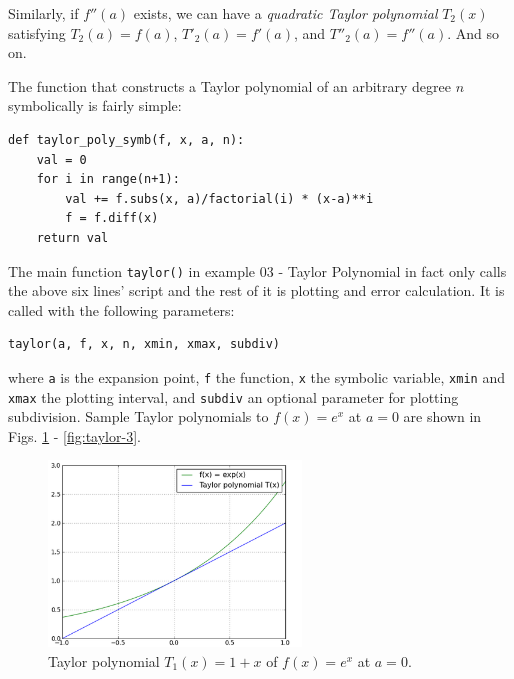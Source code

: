 \documentclass{article}
\begin{document}
Similarly, 
if $f''(a)$ exists, we can have a {\em quadratic Taylor polynomial} $T_2(x)$ satisfying
$T_2(a) = f(a)$, $T'_2(a) = f'(a)$, and $T''_2(a) = f''(a)$. And so on. 

The function that constructs a Taylor polynomial of an arbitrary degree $n$
symbolically is fairly simple:

\begin{verbatim}
def taylor_poly_symb(f, x, a, n):
    val = 0
    for i in range(n+1):
        val += f.subs(x, a)/factorial(i) * (x-a)**i
        f = f.diff(x)
    return val
\end{verbatim}
The main function {\tt taylor()} in example 03 - Taylor Polynomial in fact only calls the 
above six lines' script and the rest of it is plotting and error calculation. It is called 
with the following parameters:

\begin{verbatim}
taylor(a, f, x, n, xmin, xmax, subdiv)
\end{verbatim}
where {\tt a} is the expansion point, {\tt f} the function, {\tt x} the symbolic variable,
{\tt xmin} and {\tt xmax} the plotting interval, and {\tt subdiv} an optional parameter 
for plotting subdivision. Sample Taylor polynomials to $f(x) = e^x$ at $a = 0$
are shown in Figs. \ref{fig:taylor-1} - \ref{fig:taylor-3}.

\begin{figure}[!ht]
\begin{center}
\includegraphics[width=0.6\textwidth]{img/taylor-1.png}
\end{center}
\vspace{-2mm}
\caption{Taylor polynomial $T_1(x) = 1+x$ of $f(x) = e^x$ at $a = 0$.}
\label{fig:taylor-1}
\end{figure}

\newpage
\end{document}
